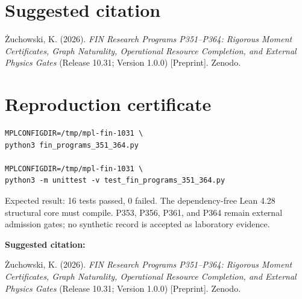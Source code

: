 \documentclass[11pt,a4paper,openany]{report}
\begin{document}
\chapter{Suggested citation}

\.Zuchowski, K. (2026). \emph{FIN Research Programs P351--P364: Rigorous Moment Certificates, Graph Naturality, Operational Resource Completion, and External Physics Gates} (Release 10.31; Version 1.0.0) [Preprint]. Zenodo.


\clearpage
\chapter*{Reproduction certificate}
\begin{Verbatim}[fontsize=\small]
MPLCONFIGDIR=/tmp/mpl-fin-1031 \
python3 fin_programs_351_364.py

MPLCONFIGDIR=/tmp/mpl-fin-1031 \
python3 -m unittest -v test_fin_programs_351_364.py
\end{Verbatim}
Expected result: 16 tests passed, 0 failed. The dependency-free Lean 4.28
structural core must compile. P353, P356, P361, and P364 remain external
admission gates; no synthetic record is accepted as laboratory evidence.

\medskip
\noindent\textbf{Suggested citation:}

\.Zuchowski, K. (2026). \emph{FIN Research Programs P351--P364:
Rigorous Moment Certificates, Graph Naturality, Operational Resource
Completion, and External Physics Gates} (Release 10.31; Version 1.0.0)
[Preprint]. Zenodo.
\end{document}
